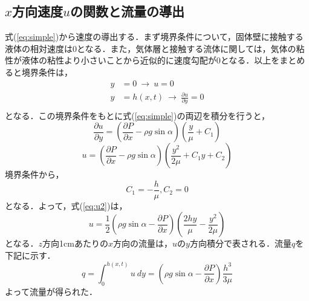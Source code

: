 \documentclass[autodetect-engine,dvipdfmx-if-dvi,ja=standard,a4paper,11pt]{bxjsarticle} %
\begin{document}
\subsection{$x$方向速度$u$の関数と流量の導出}
式(\ref{eq:simple})から速度の導出する．まず境界条件について，固体壁に接触する液体の相対速度は0となる．また，気体層と接触する流体に関しては，気体の粘性が液体の粘性より小さいことから近似的に速度勾配が0となる．以上をまとめると境界条件は，
\begin{equation}
\begin{split}
y&=0\ \rightarrow\ u=0\\
y&=h(x,t)\ \rightarrow\ 
\frac{\partial u}{\partial y}=0\\
\end{split}
\label{eq:BC1}
\end{equation}
となる．この境界条件をもとに式(\ref{eq:simple})の両辺を積分を行うと，
\begin{equation}
\frac{\partial u}{\partial y}=\left(\frac{\partial P}{\partial x}-\rho g\sin\alpha\right)\left(\frac{y}{\mu}+C_1\right)
\label{eq:u1}
\end{equation}
\begin{equation}
u=\left(\frac{\partial P}{\partial x}-\rho g\sin\alpha\right)\left(\frac{y^2}{2\mu}+C_1y+C_2\right)
\label{eq:u2}
\end{equation}
境界条件から，
\begin{equation}
C_1=-\frac{h}{\mu},C_2=0
\label{eq:u3}
\end{equation}
となる．よって，式(\ref{eq:u2})は，
\begin{equation}
u=\frac{1}{2}\left(\rho g\sin\alpha-\frac{\partial P}{\partial x}\right)\left(\frac{2hy}{\mu}-\frac{y^2}{2\mu}\right)
\label{eq:u4}
\end{equation}
となる．$z$方向1cmあたりの$x$方向の流量は，$u$の$y$方向積分で表される．流量$q$を下記に示す．
\begin{equation}
q=\displaystyle\int_{0}^{h(x,t)}u\ dy=\left(\rho g\sin\alpha-\frac{\partial P}{\partial x}\right)\frac{h^3}{3\mu}
\label{eq:q}
\end{equation}
よって流量が得られた．
\end{document}
